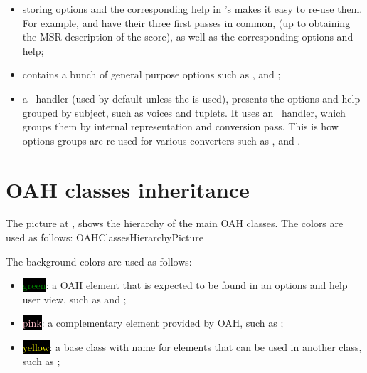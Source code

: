 \begin{itemize}
\item storing options and the corresponding help in 's makes it easy to re-use them.
    For example,  and  have their three first passes in common,
    (up to obtaining the MSR description of the score),
    as well as the corresponding options and help;

\item {} contains a bunch of general purpose options
    such as ,  and ;

\item a \regular\ handler (used by default unless the  is used),
    presents the options and help grouped by subject, such as voices and tuplets.
    It uses an \insider\ handler, which groups them by internal representation
    and conversion pass.
    This is how options groups are re-used for various
    converters such as ,  and .

\end{itemize}


\section{OAH classes inheritance}\label{OAH classes inheritance}

The picture at , shows the hierarchy of the main OAH classes. The  colors are used as follows:
{OAHClassesHierarchyPicture}

The background colors are used as follows:
\begin{itemize}
\item \colorbox{black}{\textcolor{green}{green}}: a OAH element that is expected to be found in an options and help user view, such as  and ;

\item \colorbox{black}{\textcolor{pink}{pink}}: a complementary element provided by OAH, such as ;

\item \colorbox{black}{\textcolor{yellow}{yellow}}: a base class   with name  for elements that can be used in another class, such as ;
\end{itemize}

